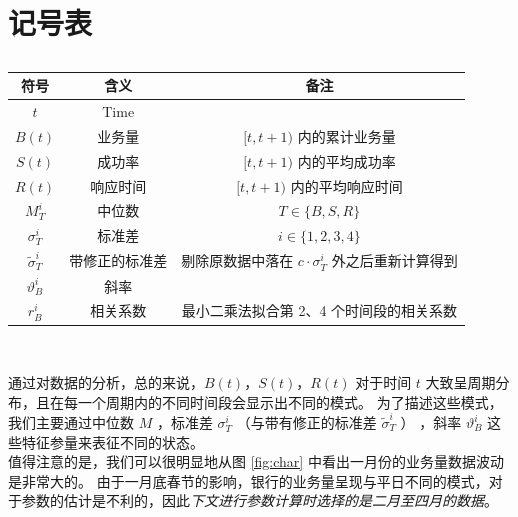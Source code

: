\documentclass[a4paper]{article}
\begin{document}
\section*{记号表}
\begin{table}[H]
	\centering
	\caption{}
	\label{tab:problem1_symbols}
	\begin{tabular}{ccc}
		\hline
		符号 & 含义 & 备注 \\
		\hline
		$t$ & Time & \\
        $B(t)$ & 业务量 & $[t, t+1)$ 内的累计业务量 \\
		$S(t)$ & 成功率 & $[t, t+1)$ 内的平均成功率 \\
		$R(t)$ & 响应时间 & $[t, t+1)$ 内的平均响应时间 \\
		$M_T^i$ & 中位数 & $T \in \{B, S, R\}$ \\
        $\sigma_T^i$ & 标准差 & $i \in \{1, 2, 3, 4\}$ \\
		$\tilde{\sigma}_T^i$ & 带修正的标准差 & 剔除原数据中落在 $c \cdot \sigma_T^i$ 外之后重新计算得到 \\
		$\vartheta_B^i$ & 斜率 & \\
        $r_B^i$ & 相关系数 & 最小二乘法拟合第 2、4 个时间段的相关系数\\
		\hline
	\end{tabular} \\
\end{table}
通过对数据的分析，总的来说，$B(t)$，$S(t)$，$R(t)$ 对于时间 $t$ 大致呈周期分布，且在每一个周期内的不同时间段会显示出不同的模式。
为了描述这些模式，我们主要通过中位数 $M$ ，标准差 $\sigma_T^i$ （与带有修正的标准差 $\tilde{\sigma}_T^i$ ） ，斜率 $\vartheta_B^i$ 这些特征参量来表征不同的状态。
\\
值得注意的是，我们可以很明显地从图 \ref{fig:char} 中看出一月份的业务量数据波动是非常大的。
由于一月底春节的影响，银行的业务量呈现与平日不同的模式，对于参数的估计是不利的，因此\emph{下文进行参数计算时选择的是二月至四月的数据}。
\end{document}
